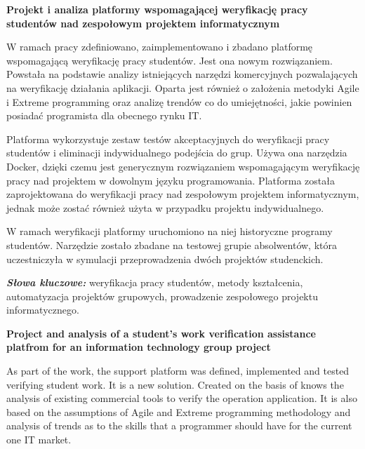 \newpage
\vspace{10cm}

\newpage
\begin{center}
	\textbf{Projekt i analiza platformy wspomagającej weryfikację pracy studentów
nad zespołowym projektem informatycznym}
\end{center}
 \newline

W ramach pracy zdefiniowano, zaimplementowano i zbadano platformę wspomagającą weryfikację pracy studentów.
Jest ona nowym rozwiązaniem.
Powstała na podstawie analizy istniejących narzędzi komercyjnych pozwalających na weryfikację działania aplikacji.
Oparta jest również o założenia metodyki Agile i Extreme programming oraz analizę trendów co do umiejętności, jakie powinien posiadać programista dla obecnego rynku IT.

Platforma wykorzystuje zestaw testów akceptacyjnych do weryfikacji pracy studentów i eliminacji indywidualnego podejścia do grup.
Używa ona narzędzia Docker, dzięki czemu jest generycznym rozwiązaniem wspomagającym weryfikację pracy nad projektem w dowolnym języku programowania.
Platforma została zaprojektowana do weryfikacji pracy nad zespołowym projektem informatycznym, jednak może zostać również użyta w przypadku projektu indywidualnego.

W ramach weryfikacji platformy uruchomiono na niej historyczne programy studentów.
Narzędzie zostało zbadane na testowej grupie absolwentów, która uczestniczyła w symulacji przeprowadzenia dwóch projektów studenckich. \newline



\textit{\textbf{Słowa kluczowe:}} weryfikacja pracy studentów, metody kształcenia, automatyzacja projektów grupowych, prowadzenie zespołowego projektu informatycznego.

	\vspace{1cm}

\vfill
\pagebreak

\begin{center}
    \textbf{Project and analysis of a student's work verification assistance platfrom for an information technology group project}
\end{center}
 \newline

As part of the work, the support platform was defined, implemented and tested verifying student work.
It is a new solution.
Created on the basis of knows the analysis of existing commercial tools to verify the operation application.
It is also based on the assumptions of Agile and Extreme programming methodology and analysis of trends as to the skills that a programmer should have for the current one IT market.

